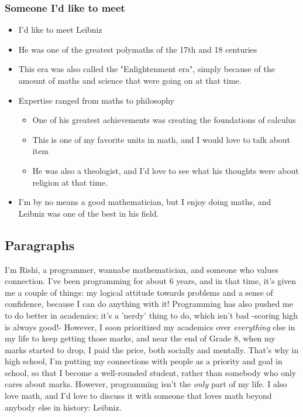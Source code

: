 \documentclass[]{article}
\begin{document}
\subsubsection*{Someone I'd like to meet}
\begin{itemize}
    \item I'd like to meet Leibniz
    \item He was one of the greatest polymaths of the 17th and 18 centuries
    \item This era was also called the "Enlightenment era", simply because of the amount of maths and science that were going on at that time.
    \item Expertise ranged from maths to philosophy
    \begin{itemize}
        \item One of his greatest achievements was creating the foundations of calculus
        \item This is one of my favorite units in math, and I would love to talk about item
        \item He was also a theologist, and I'd love to see what his thoughts were about religion at that time.
    \end{itemize}
    \item I'm by no means a good mathematician, but I enjoy doing maths, and Leibniz was one of the best in his field.
\end{itemize}

\subsection*{Paragraphs}
I'm Rishi, a programmer, wannabe mathematician, and someone who values connection. I've been programming for about 6 years, and in that time, it's given me a couple of things: my logical attitude towards problems and a sense of confidence, because I can do anything with it! Programming has also pushed me to do better in academics; it's a 'nerdy' thing to do, which isn't bad -scoring high is always good!- However, I soon prioritized my academics over \textit{everything} else in my life to keep getting those marks, and near the end of Grade 8, when my marks started to drop, I paid the price, both socially and mentally. That's why in high school, I'm putting my connections with people as a priority and goal in school, so that I become a well-rounded student, rather than somebody who only cares about marks. However, programming isn't the \textit{only} part of my life. I also love math, and I'd love to discuss it with someone that loves math beyond anybody else in history: Leibniz.
\end{document}
